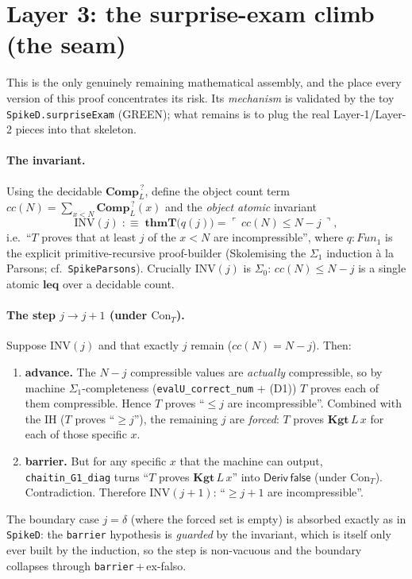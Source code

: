 \documentclass[11pt]{article}
\theoremstyle{plain}
\theoremstyle{definition}
\theoremstyle{remark}
\newcommand{\code}[1]{\ulcorner #1 \urcorner}
\newcommand{\thmT}{\mathbf{thmT}}
\newcommand{\Deriv}{\mathsf{Deriv}}
\newcommand{\Con}{\mathrm{Con}_T}
\newcommand{\Kgt}{\mathbf{Kgt}}
\newcommand{\Comp}{\mathbf{Comp}}
\newcommand{\false}{\mathsf{false}}
\begin{document}
\section{Layer 3: the surprise-exam climb (the seam)}

This is the only genuinely remaining mathematical assembly, and the place every
version of this proof concentrates its risk. Its \emph{mechanism} is validated by
the toy \texttt{SpikeD.surpriseExam} (GREEN); what remains is to plug the real
Layer-1/Layer-2 pieces into that skeleton.

\paragraph{The invariant.} Using the decidable $\Comp_L^{\,?}$, define the object
count term $\mathit{cc}(N) = \sum_{x<N}\Comp_L^{\,?}(x)$ and the \emph{object
atomic} invariant
\[
  \mathrm{INV}(j) \;:\equiv\; \thmT\big(q(j)\big) =
  \code{\,\mathit{cc}(N) \le N - j\,},
\]
i.e.\ ``$T$ proves that at least $j$ of the $x<N$ are incompressible'', where
$q : \mathit{Fun}_1$ is the explicit primitive-recursive proof-builder
(Skolemising the $\Sigma_1$ induction \`a la Parsons; cf.\ \texttt{SpikeParsons}).
Crucially $\mathrm{INV}(j)$ is $\Sigma_0$: $\mathit{cc}(N)\le N-j$ is a single
atomic $\mathbf{leq}$ over a decidable count.

\paragraph{The step $j \to j+1$ (under $\Con$).} Suppose $\mathrm{INV}(j)$ and
that exactly $j$ remain ($\mathit{cc}(N) = N-j$). Then:
\begin{enumerate}
\item \textbf{advance.} The $N-j$ compressible values are \emph{actually}
  compressible, so by machine $\Sigma_1$-completeness
  (\texttt{evalU\_correct\_num} + (D1)) $T$ proves each of them compressible.
  Hence $T$ proves ``$\le j$ are incompressible''. Combined with the IH
  ($T$ proves ``$\ge j$''), the remaining $j$ are \emph{forced}: $T$ proves
  $\Kgt\,L\,x$ for each of those specific $x$.
\item \textbf{barrier.} But for any specific $x$ that the machine can output,
  \texttt{chaitin\_G1\_diag} turns ``$T$ proves $\Kgt\,L\,x$'' into
  $\Deriv\,\false$ (under $\Con$). Contradiction. Therefore $\mathrm{INV}(j+1)$:
  ``$\ge j+1$ are incompressible''.
\end{enumerate}
The boundary case $j=\delta$ (where the forced set is empty) is absorbed exactly
as in \texttt{SpikeD}: the \texttt{barrier} hypothesis is \emph{guarded} by the
invariant, which is itself only ever built by the induction, so the step is
non-vacuous and the boundary collapses through \texttt{barrier}\,+\,ex-falso.
\end{document}
